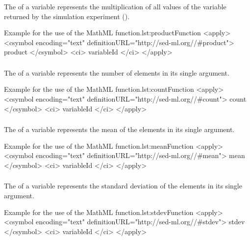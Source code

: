 \subsubsection*{}
\label{fun:product}
The  of a variable represents the multiplication of all values of the variable returned by the simulation experiment ().
\begin{myXmlLst}{Example for the use of the MathML  function.}{lst:productFunction}
<apply>
 	<csymbol encoding="text" definitionURL="http://sed-ml.org//#product">
 		product
 	</csymbol>
 	<ci> variableId </ci>
</apply>
\end{myXmlLst}

\begin{blockChanged}

\subsubsection*{}
\label{fun:count}
The \sedcount of a variable represents the number of elements in its single argument.
\begin{myXmlLst}{Example for the use of the MathML  function.}{lst:countFunction}
<apply>
 	<csymbol encoding="text" definitionURL="http://sed-ml.org//#count">
 		count
 	</csymbol>
 	<ci> variableId </ci>
</apply>
\end{myXmlLst}


\subsubsection*{}
\label{fun:mean}
The \mean of a variable represents the mean of the elements in its single argument.
\begin{myXmlLst}{Example for the use of the MathML  function.}{lst:meanFunction}
<apply>
 	<csymbol encoding="text" definitionURL="http://sed-ml.org//#mean">
 		mean
 	</csymbol>
 	<ci> variableId </ci>
</apply>
\end{myXmlLst}


\subsubsection*{}
\label{fun:stdev}
The \stdev of a variable represents the standard deviation of the elements in its single argument.
\begin{myXmlLst}{Example for the use of the MathML  function.}{lst:stdevFunction}
<apply>
 	<csymbol encoding="text" definitionURL="http://sed-ml.org//#stdev">
 		stdev
 	</csymbol>
 	<ci> variableId </ci>
</apply>
\end{myXmlLst}



\end{blockChanged}
